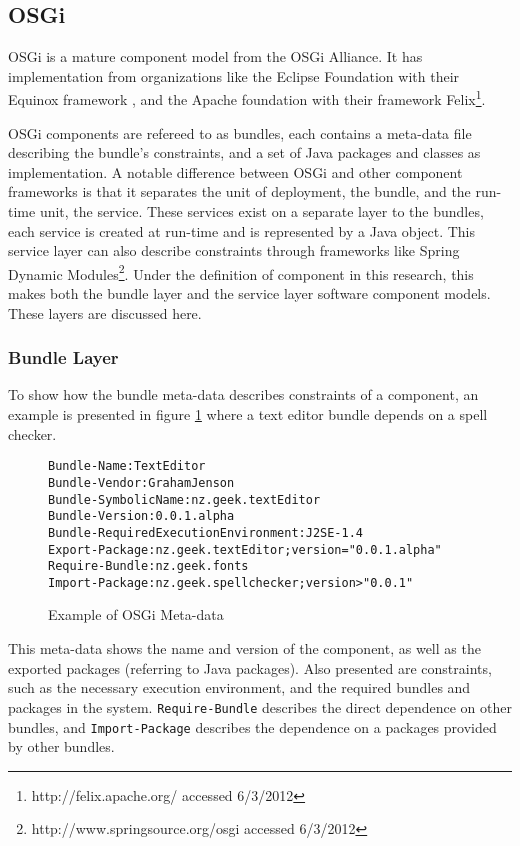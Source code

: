 \subsection{OSGi}
OSGi is a mature component model from the OSGi Alliance.
It has implementation from organizations like the Eclipse Foundation with their Equinox framework \citep{mcaffer2010osgi}, 
and the Apache foundation with their framework Felix\footnote{http://felix.apache.org/ accessed 6/3/2012}.

OSGi components are refereed to as bundles, each contains a meta-data file describing the bundle's constraints, and a set of Java packages and classes as implementation.
A notable difference between OSGi and other component frameworks is that it separates the unit of deployment, the bundle, and the run-time unit, the service.
These services exist on a separate layer to the bundles, each service is created at run-time and is represented by a Java object.
This service layer can also describe constraints through frameworks like Spring Dynamic Modules\footnote{http://www.springsource.org/osgi accessed 6/3/2012}.
Under the definition of component in this research, this makes both the bundle layer and the service layer software component models.
These layers are discussed here.

\subsubsection{Bundle Layer}
To show how the bundle meta-data describes constraints of a component,
an example is presented in figure \ref{osgibundle} where a text editor bundle depends on a spell checker.
\begin{figure}[htp]
\begin{center}
\begin{alltt}
Bundle-Name: TextEditor
Bundle-Vendor: Graham Jenson
Bundle-SymbolicName: nz.geek.textEditor
Bundle-Version: 0.0.1.alpha
Bundle-RequiredExecutionEnvironment: J2SE-1.4
Export-Package: nz.geek.textEditor;version="0.0.1.alpha"
Require-Bundle: nz.geek.fonts
Import-Package: nz.geek.spellchecker;version>"0.0.1"
\end{alltt}
  \caption[OSGi Meta-data]{Example of OSGi Meta-data}
  \label{osgibundle}
\end{center}
\end{figure}

This meta-data shows the name and version of the component, as well as the exported packages (referring to Java packages).
Also presented are constraints, such as the necessary execution environment, and the required bundles and packages in the system.
\texttt{Require-Bundle} describes the direct dependence on other bundles, and
\texttt{Import-Package} describes the dependence on a packages provided by other bundles.

